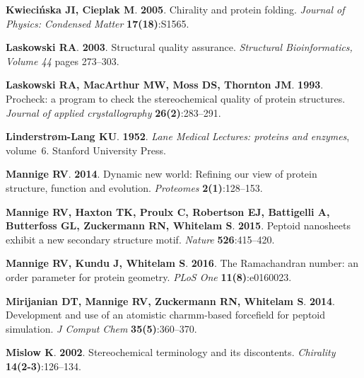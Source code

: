 \documentclass[fleqn,10pt,lineno]{wlpeerj} %
\begin{document}
\begin{thebibliography}{58}
\textbf{Kwieci{\'n}ska JI, Cieplak M}. \textbf{2005}.
\newblock Chirality and protein folding.
\newblock \emph{Journal of Physics: Condensed Matter} \textbf{17(18)}:S1565.

\textbf{Laskowski RA}. \textbf{2003}.
\newblock Structural quality assurance.
\newblock \emph{Structural Bioinformatics, Volume 44} pages 273--303.

\textbf{Laskowski RA, MacArthur MW, Moss DS, Thornton JM}. \textbf{1993}.
\newblock Procheck: a program to check the stereochemical quality of protein
  structures.
\newblock \emph{Journal of applied crystallography} \textbf{26(2)}:283--291.

\textbf{Linderstr{\o}m-Lang KU}. \textbf{1952}.
\newblock \emph{Lane Medical Lectures: proteins and enzymes}, volume~6.
\newblock Stanford University Press.

\textbf{Mannige RV}. \textbf{2014}.
\newblock Dynamic new world: Refining our view of protein structure, function
  and evolution.
\newblock \emph{Proteomes} \textbf{2(1)}:128--153.

\textbf{Mannige RV, Haxton TK, Proulx C, Robertson EJ, Battigelli A, Butterfoss
  GL, Zuckermann RN, Whitelam S}. \textbf{2015}.
\newblock Peptoid nanosheets exhibit a new secondary structure motif.
\newblock \emph{Nature} \textbf{526}:415--420.

\textbf{Mannige RV, Kundu J, Whitelam S}. \textbf{2016}.
\newblock The {R}amachandran number: an order parameter for protein geometry.
\newblock \emph{PLoS One} \textbf{11(8)}:e0160023.

\textbf{Mirijanian DT, Mannige RV, Zuckermann RN, Whitelam S}. \textbf{2014}.
\newblock Development and use of an atomistic charmm-based forcefield for
  peptoid simulation.
\newblock \emph{J Comput Chem} \textbf{35(5)}:360--370.

\textbf{Mislow K}. \textbf{2002}.
\newblock Stereochemical terminology and its discontents.
\newblock \emph{Chirality} \textbf{14(2-3)}:126--134.


\end{thebibliography}
\end{document}
